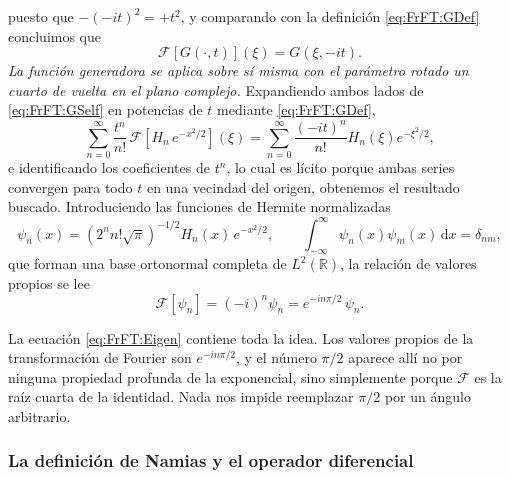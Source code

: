 			puesto que $-(-it)^{2} = +t^{2}$, y comparando con la definición \eqref{eq:FrFT:GDef} concluimos que
			\begin{equation}\label{eq:FrFT:GSelf}
				\mathcal{F}\left[G(\cdot,t)\right](\xi) = G(\xi,-it).
			\end{equation}
			\textit{La función generadora se aplica sobre sí misma con el parámetro rotado un cuarto de vuelta en el plano complejo.} Expandiendo ambos lados de \eqref{eq:FrFT:GSelf} en potencias de $t$ mediante \eqref{eq:FrFT:GDef},
			\begin{equation*}
				\sum_{n=0}^{\infty}\frac{t^{n}}{n!}\,\mathcal{F}\!\left[H_{n}\,e^{-x^{2}/2}\right](\xi) = \sum_{n=0}^{\infty}\frac{\left(-it\right)^{n}}{n!}H_{n}(\xi)e^{-\xi^{2}/2},
			\end{equation*}
			e identificando los coeficientes de $t^{n}$, lo cual es lícito porque ambas series convergen para todo $t$ en una vecindad del origen, obtenemos el resultado buscado. Introduciendo las funciones de Hermite normalizadas
			\begin{equation}\label{eq:FrFT:HermiteFunctions}
				\psi_{n}(x) = \left(2^{n}n!\sqrt{\pi}\right)^{-1/2}H_{n}(x)\,e^{-x^{2}/2}, \qquad \int_{-\infty}^{\infty}\psi_{n}(x)\psi_{m}(x)\,\mathrm{d}x = \delta_{nm},
			\end{equation}
			que forman una base ortonormal completa de $L^{2}(\mathbb{R})$, la relación de valores propios se lee
			\begin{equation}\label{eq:FrFT:Eigen}
				\mathcal{F}\left[\psi_{n}\right] = \left(-i\right)^{n}\psi_{n} = e^{-in\pi/2}\,\psi_{n}.
			\end{equation}

			La ecuación \eqref{eq:FrFT:Eigen} contiene toda la idea. Los valores propios de la transformación de Fourier son $e^{-in\pi/2}$, y el número $\pi/2$ aparece allí no por ninguna propiedad profunda de la exponencial, sino simplemente porque $\mathcal{F}$ es la raíz cuarta de la identidad. Nada nos impide reemplazar $\pi/2$ por un ángulo arbitrario.

		\subsubsection{La definición de Namias y el operador diferencial}

